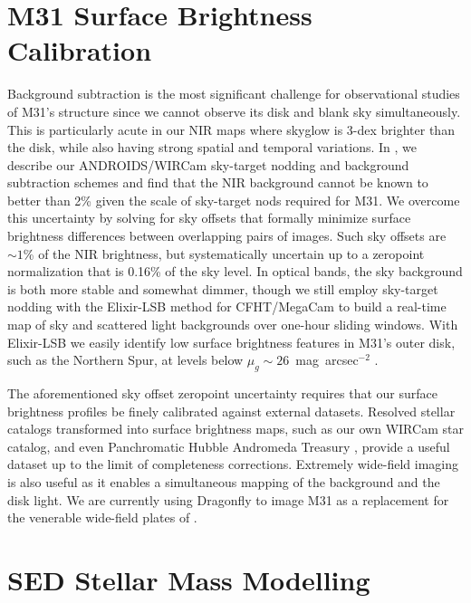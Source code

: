 \documentclass{iau}
\begin{document}
\section{M31 Surface Brightness Calibration}

Background subtraction is the most significant challenge for observational studies of M31's structure since we cannot observe its disk and blank sky simultaneously.
This is particularly acute in our NIR maps where skyglow is 3-dex brighter than the disk, while also having strong spatial and temporal variations.
In \cite{Sick:2014}, we describe our ANDROIDS/WIRCam sky-target nodding and background subtraction schemes and find that the NIR background cannot be known to better than 2\% given the scale of sky-target nods required for M31.
We overcome this uncertainty by solving for sky offsets that formally minimize surface brightness differences between overlapping pairs of images.
Such sky offsets are $\sim1$\% of the NIR brightness, but systematically uncertain up to a zeropoint normalization that is 0.16\% of the sky level.
In optical bands, the sky background is both more stable and somewhat dimmer, though we still employ sky-target nodding with the Elixir-LSB method for CFHT/MegaCam to build a real-time map of sky and scattered light backgrounds over one-hour sliding windows.
With Elixir-LSB we easily identify low surface brightness features in M31's outer disk, such as the Northern Spur, at levels below $\mu_g\sim26$~mag~arcsec$^{-2}$ \citep{Sick:2013a}.

The aforementioned sky offset zeropoint uncertainty requires that our surface brightness profiles be finely calibrated against external datasets. Resolved stellar catalogs transformed into surface brightness maps, such as our own WIRCam star catalog, and even Panchromatic Hubble Andromeda Treasury \citep[PHAT;][]{Dalcanton:2012}, provide a useful dataset up to the limit of completeness corrections. Extremely wide-field imaging is also useful as it enables a simultaneous mapping of the background and the disk light.  We are currently using Dragonfly \citep{Abraham:2014} to image M31 as a replacement for the venerable wide-field plates of \cite{Walterbos:1987}.

\section{SED Stellar Mass Modelling}
\end{document}
